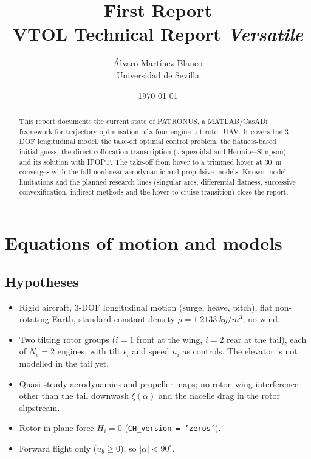 \documentclass[11pt,a4paper]{article}
\title{First Report\\[0.5em]
  \large VTOL Technical Report \textit{Versatile}}
\author{Álvaro Martínez Blanco\\ \small Universidad de Sevilla}
\date{\today}
\newcommand{\code}[1]{\texttt{\small #1}}
\begin{document}
\maketitle

\begin{abstract}
This report documents the current state of PATRONUS, a MATLAB/CasADi framework for
trajectory optimisation of a four-engine tilt-rotor UAV. It covers the 3-DOF longitudinal
model, the take-off optimal control problem, the flatness-based initial guess, the direct
collocation transcription (trapezoidal and Hermite--Simpson) and its solution with IPOPT.
The take-off from hover to a trimmed hover at \SI{30}{m} converges with the full nonlinear
aerodynamic and propulsive models. Known model limitations and the planned research
lines (singular arcs, differential flatness, successive convexification, indirect methods
and the hover-to-cruise transition) close the report.
\end{abstract}

\tableofcontents
\newpage

\section{Equations of motion and models}\label{sec:models}

\subsection{Hypotheses}
\begin{itemize}
  \item Rigid aircraft, 3-DOF longitudinal motion (surge, heave, pitch), flat non-rotating
        Earth, standard constant density $\rho = \SI{1.2133}{kg/m^3}$, no wind.
  \item Two tilting rotor groups ($i=1$ front at the wing, $i=2$ rear at the tail), each of
        $N_e = 2$ engines, with tilt $\epsilon_i$ and speed $n_i$ as controls.
        The elevator is not modelled in the tail yet.
  \item Quasi-steady aerodynamics and propeller maps; no rotor--wing interference other than
        the tail downwash $\xi(\alpha)$ and the nacelle drag in the rotor slipstream.
  \item Rotor in-plane force $H_i = 0$ (\code{CH\_version = 'zeros'}).
  \item Forward flight only ($u_b \ge 0$), so $|\alpha| < 90^\circ$.
\end{itemize}
\end{document}
